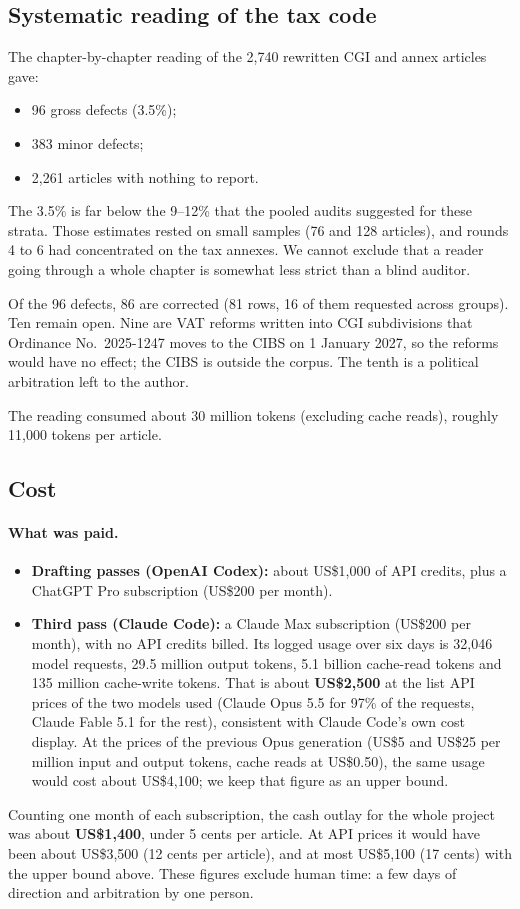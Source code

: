 \documentclass[11pt,a4paper]{article}
\begin{document}
\subsection{Systematic reading of the tax code}

The chapter-by-chapter reading of the 2{,}740 rewritten CGI and annex articles gave:
\begin{itemize}
  \item 96 gross defects (3.5\%);
  \item 383 minor defects;
  \item 2{,}261 articles with nothing to report.
\end{itemize}
The 3.5\% is far below the 9--12\% that the pooled audits suggested for these strata. Those estimates rested on small samples (76 and 128 articles), and rounds 4 to 6 had concentrated on the tax annexes. We cannot exclude that a reader going through a whole chapter is somewhat less strict than a blind auditor.

Of the 96 defects, 86 are corrected (81 rows, 16 of them requested across groups). Ten remain open. Nine are VAT reforms written into CGI subdivisions that Ordinance No.~2025-1247 moves to the CIBS on 1 January 2027, so the reforms would have no effect; the CIBS is outside the corpus. The tenth is a political arbitration left to the author.

The reading consumed about 30 million tokens (excluding cache reads), roughly 11{,}000 tokens per article.

\subsection{Cost}
\label{sec:cost}

\paragraph{What was paid.}
\begin{itemize}
  \item \textbf{Drafting passes (OpenAI Codex):} about US\$1{,}000 of API credits, plus a ChatGPT Pro subscription (US\$200 per month).
  \item \textbf{Third pass (Claude Code):} a Claude Max subscription (US\$200 per month), with no API credits billed. Its logged usage over six days is 32{,}046 model requests, 29.5 million output tokens, 5.1 billion cache-read tokens and 135 million cache-write tokens. That is about \textbf{US\$2{,}500} at the list API prices of the two models used (Claude Opus 5.5 for 97\% of the requests, Claude Fable 5.1 for the rest), consistent with Claude Code's own cost display. At the prices of the previous Opus generation (US\$5 and US\$25 per million input and output tokens, cache reads at US\$0.50), the same usage would cost about US\$4{,}100; we keep that figure as an upper bound.
\end{itemize}
Counting one month of each subscription, the cash outlay for the whole project was about \textbf{US\$1{,}400}, under 5 cents per article. At API prices it would have been about US\$3{,}500 (12 cents per article), and at most US\$5{,}100 (17 cents) with the upper bound above. These figures exclude human time: a few days of direction and arbitration by one person.
\end{document}
